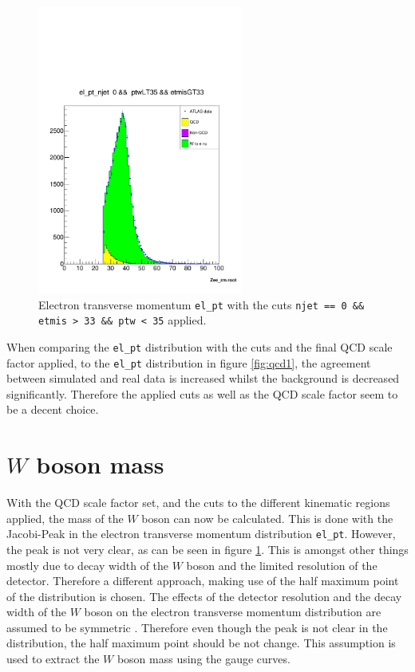     \begin{figure}
        \centering
        \includegraphics[width=0.6\textwidth]{../W_mass/el_pt_final_cut_selection.pdf}
        \caption{Electron transverse momentum \texttt{el\_pt} with the cuts \texttt{njet == 0 \&\& etmis > 33 \&\& ptw < 35} applied.}
        \label{fig:el_pt_cuts}
    \end{figure}
    When comparing the \texttt{el\_pt} distribution with the cuts and the final QCD scale factor applied, to the \texttt{el\_pt} distribution in figure \ref{fig:qcd1},
    the agreement between simulated and real data is increased whilst the background is decreased significantly. Therefore the applied cuts as well as the QCD scale factor
    seem to be a decent choice.

\section{$W$ boson mass}
    With the QCD scale factor set, and the cuts to the different kinematic regions applied, the mass of the $W$ boson can now be calculated.
    This is done with the Jacobi-Peak in the electron transverse momentum distribution \texttt{el\_pt}. However, the peak is not very clear, as can be seen in figure
    \ref{fig:el_pt_cuts}. This is amongst other things mostly due to decay width of the $W$ boson and the limited resolution of the detector. 
    Therefore a different approach, making use of the half maximum point of the distribution is chosen. The effects of the detector resolution and the decay width 
    of the $W$ boson on the electron transverse momentum distribution are assumed to be symmetric \cite{atlaslabmanual}. Therefore even though the peak is not clear in the distribution,
    the half maximum point should be not change. This assumption is used to extract the $W$ boson mass using the gauge curves.


